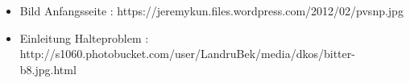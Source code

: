 \begin{frame}
	\begin{itemize}
	  \item Bild Anfangsseite :
	  https://jeremykun.files.wordpress.com/2012/02/pvsnp.jpg
	  \item Einleitung Halteproblem :
	  http://s1060.photobucket.com/user/LandruBek/media/dkos/bitter-b8.jpg.html
	\end{itemize}
\end{frame}